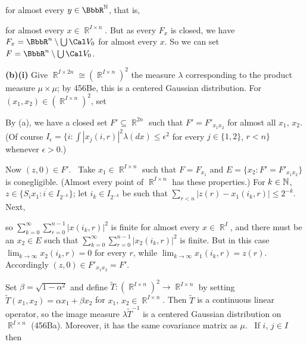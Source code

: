 {\noindent for almost every $y\in\BbbR^{\Bbb N}$, that is,


\noindent for almost every $x\in\BbbR^{I\times n}$.   But as every $F_x$
is closed, we have
$F_x=\BbbR^n\setminus\bigcup\Cal V_0$ for almost every $x$.   So we can
set $F=\BbbR^n\setminus\bigcup\Cal V_0$.

\medskip

{\bf (b)(i)} Give $\BbbR^{I\times 2n}\cong(\BbbR^{I\times n})^2$ the
measure $\lambda$ corresponding to the product measure $\mu\times\mu$;
by 456Be, this is a centered Gaussian distribution.   For
$(x_1,x_2)\in(\BbbR^{I\times n})^2$, set


\noindent By (a), we have a closed set $F'\subseteq\BbbR^{2n}$ such that
$F'=F'_{x_1x_2}$ for almost all $x_1$, $x_2$.   (Of course
$I_{\epsilon}=\{i:\int|x_j(i,r)|^2\lambda(dx)\le\epsilon^2$ for every
$j\in\{1,2\}$, $r<n\}$ whenever $\epsilon>0$.)

\medskip

 Now $(z,0)\in F'$.   \Prf\ Take
$x_1\in\BbbR^{I\times n}$ such that $F=F_{x_1}$ and
$E=\{x_2:F'=F'_{x_1x_2}\}$ is conegligible.   (Almost every point of
$\BbbR^{I\times n}$ has these properties.)   For $k\in\Bbb N$,
$z\in\overline{\{S_ix_1:i\in I_{2^{-k}}\}}$;  let
$i_k\in I_{2^{-k}}$ be such that
$\sum_{r<n}|z(r)-x_1(i_k,r)|\le 2^{-k}$.   Next,


\noindent so $\sum_{k=0}^{\infty}\sum_{r=0}^{n-1}|x(i_k,r)|^2$ is finite
for almost every $x\in\BbbR^I$, and there must be an
$x_2\in E$ such that
$\sum_{k=0}^{\infty}\sum_{r=0}^{n-1}|x_2(i_k,r)|^2$ is finite.   But in
this case $\lim_{k\to\infty}x_2(i_k,r)=0$ for every $r$, while
$\lim_{k\to\infty}x_1(i_k,r)=z(r)$.   Accordingly
$(z,0)\in F'_{x_1x_2}=F'$.\ \Qed

\medskip

 Set $\beta=\sqrt{1-\alpha^2}$ and define
$\tilde T:(\BbbR^{I\times n})^2\to\BbbR^{I\times n}$ by setting
$\tilde T(x_1,x_2)=\alpha x_1+\beta x_2$ for $x_1$,
$x_2\in\BbbR^{I\times n}$.    Then $\tilde T$ is a continuous linear
operator, so the image measure $\lambda\tilde T^{-1}$ is a centered
Gaussian distribution on $\BbbR^{I\times n}$ (456Ba).   Moreover, it has
the same covariance matrix as $\mu$.   \Prf\ If $i$, $j\in I$ then

}
